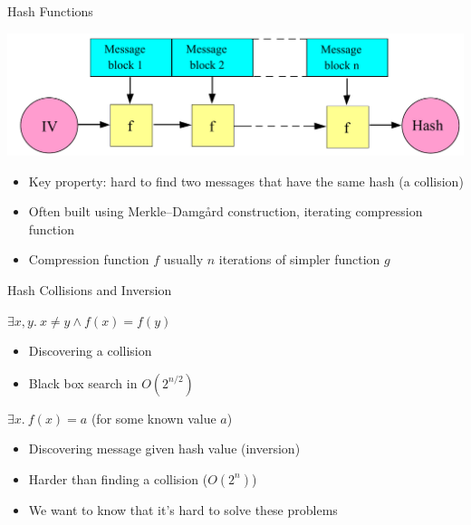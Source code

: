 \documentclass[ignorenonframetext,]{beamer}
\providecommand{\tightlist}{%
  \setlength{\itemsep}{0pt}\setlength{\parskip}{0pt}}
\begin{document}
\begin{frame}{Hash Functions}

\begin{center}
\includegraphics[width=\textwidth]{images/Merkle-damgard.pdf}
\end{center}

\begin{itemize}
\tightlist
\item
  Key property: hard to find two messages that have the same hash (a
  \alert{collision})
\item
  Often built using Merkle--Damgård construction, iterating compression
  function
\item
  Compression function \(f\) usually \(n\) iterations of simpler
  function \(g\)
\end{itemize}

\end{frame}

\begin{frame}{Hash Collisions and Inversion}

\begin{center}
$\exists x, y.~x \neq y \wedge f(x) = f(y)$
\end{center}

\begin{itemize}
\tightlist
\item
  Discovering a collision
\item
  Black box search in \(O(2^{n/2})\)
\end{itemize}

\begin{center}
$\exists x.~f(x) = a$ (for some known value $a$)
\end{center}

\begin{itemize}
\item
  Discovering message given hash value (inversion)
\item
  Harder than finding a collision (\(O(2^{n})\))
\item
  We want to know that it's \alert{hard} to solve these problems
\end{itemize}

\end{frame}
\end{document}
